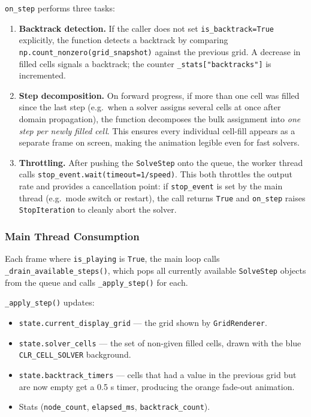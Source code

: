 \texttt{on\_step} performs three tasks:

\begin{enumerate}
  \item \textbf{Backtrack detection.}
        If the caller does not set \texttt{is\_backtrack=True} explicitly,
        the function detects a backtrack by comparing
        \texttt{np.count\_nonzero(grid\_snapshot)} against the previous grid.
        A decrease in filled cells signals a backtrack; the counter
        \texttt{\_stats["backtracks"]} is incremented.

  \item \textbf{Step decomposition.}
        On forward progress, if more than one cell was filled since the last
        step (e.g.\ when a solver assigns several cells at once after domain
        propagation), the function decomposes the bulk assignment into
        \emph{one step per newly filled cell}.
        This ensures every individual cell-fill appears as a separate frame on
        screen, making the animation legible even for fast solvers.

  \item \textbf{Throttling.}
        After pushing the \texttt{SolveStep} onto the queue, the worker
        thread calls \texttt{stop\_event.wait(timeout=1/speed)}.
        This both throttles the output rate and provides a cancellation point:
        if \texttt{stop\_event} is set by the main thread (e.g.\ mode switch
        or restart), the call returns \texttt{True} and \texttt{on\_step}
        raises \texttt{StopIteration} to cleanly abort the solver.
\end{enumerate}

\subsubsection{Main Thread Consumption}

Each frame where \texttt{is\_playing} is \texttt{True}, the main loop calls
\texttt{\_drain\_available\_steps()}, which pops all currently available
\texttt{SolveStep} objects from the queue and calls \texttt{\_apply\_step()}
for each.

\texttt{\_apply\_step()} updates:
\begin{itemize}
  \item \texttt{state.current\_display\_grid} — the grid shown by
        \texttt{GridRenderer}.
  \item \texttt{state.solver\_cells} — the set of non-given filled cells,
        drawn with the blue \texttt{CLR\_CELL\_SOLVER} background.
  \item \texttt{state.backtrack\_timers} — cells that had a value in the
        previous grid but are now empty get a 0.5 s timer, producing the
        orange fade-out animation.
  \item Stats (\texttt{node\_count}, \texttt{elapsed\_ms},
        \texttt{backtrack\_count}).
\end{itemize}

